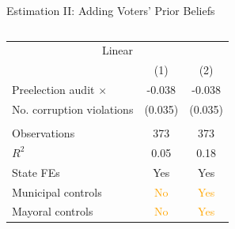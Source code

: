 \begin{frame}{Estimation II: Adding Voters' Prior Beliefs}
\begin{columns}
\begin{column}{0.55\textwidth}
{\begin{table}[h!]
\begin{center}
\begin{tabular}{lcc}
                        \multicolumn{3}{c}{\color{orange}Linear}\\
                        & (1) & (2) \\
                        \hline
                        Preelection audit $\times$ & -0.038 & -0.038 \\
                         No. corruption violations & (0.035) & (0.035) \\
                         & \\
                         Observations & 373 & 373 \\
                         $R^2$ & 0.05 & 0.18\\
                         State FEs & Yes & Yes\\
                         Municipal controls & \textcolor{orange}{No} & \textcolor{orange}{Yes} \\
                         Mayoral controls & \textcolor{orange}{No} & \textcolor{orange}{Yes} 
                        \end{tabular}
                    \end{center}
                    \end{table}
            }
        
        \end{column}

    \end{columns}

\end{frame}

